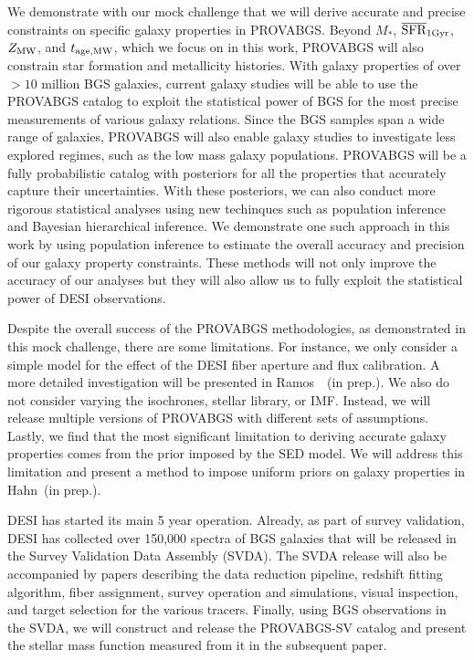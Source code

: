 We demonstrate with our mock challenge that we will derive accurate and precise
constraints on specific galaxy properties in PROVABGS. 
Beyond $M_*$, $\overline{\rm SFR}_{\rm 1Gyr}$, $Z_{\rm MW}$, and $t_{\rm age, MW}$, which we focus on in this work, 
PROVABGS will also constrain star formation and metallicity histories. 
With galaxy properties of over ${>}10$ million BGS galaxies, current galaxy
studies will be able to use the PROVABGS catalog to exploit the statistical
power of BGS for the most precise measurements of various galaxy relations.
Since the BGS samples span a wide range of galaxies, PROVABGS will
also enable galaxy studies to investigate less explored regimes, such as the
low mass galaxy populations. 
PROVABGS will be a fully probabilistic catalog with posteriors for all the
properties that accurately capture their uncertainties.
With these posteriors, we can also conduct more rigorous statistical analyses
using new techinques such as population inference and Bayesian hierarchical
inference.
We demonstrate one such approach in this work by using population inference to
estimate the overall accuracy and precision of our galaxy property constraints. 
These methods will not only improve the accuracy of our analyses but they will
also allow us to fully exploit the statistical power of DESI observations. 

Despite the overall success of the PROVABGS methodologies, as demonstrated in
this mock challenge, there are some limitations. 
For instance, we only consider a simple model for the effect of the DESI fiber
aperture and flux calibration. 
A more detailed investigation will be presented in Ramos~\etal~(in prep.). 
We also do not consider varying the isochrones, stellar library, or IMF. 
Instead, we will release multiple versions of PROVABGS with different sets of
assumptions. 
Lastly, we find that the most significant limitation to deriving accurate
galaxy properties comes from the prior imposed by the SED model. 
We will address this limitation and present a method to impose uniform priors
on galaxy properties in Hahn~(in prep.). 

DESI has started its main 5 year operation. 
Already, as part of survey validation, DESI has collected over 150,000 spectra
of BGS galaxies that will be released in the Survey Validation Data Assembly
(SVDA). 
The SVDA release will also be accompanied by papers describing the data
reduction pipeline, redshift fitting algorithm, fiber assignment, survey
operation and simulations, visual inspection, and target selection for the
various tracers. 
Finally, using BGS observations in the SVDA, we will construct and release the
PROVABGS-SV catalog and present the stellar mass function measured from it in
the subsequent paper. 
